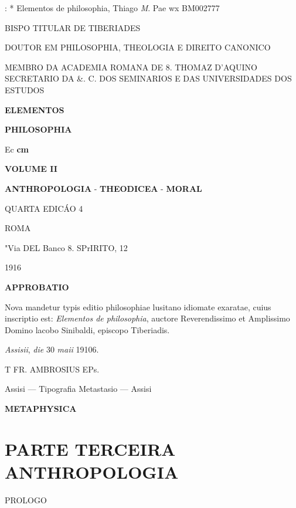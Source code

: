 
 : * \textbar{} Elementos de philosophia, Thiago \textbar{} \emph{M}. Pae wx BM002777

 BISPO TITULAR DE TIBERIADES

DOUTOR EM PHILOSOPHIA, THEOLOGIA E DIREITO CANONICO

MEMBRO DA ACADEMIA ROMANA DE 8. THOMAZ D'AQUINO SECRETARIO DA \&. C. DOS SEMINARIOS E DAS UNIVERSIDADES DOS ESTUDOS

\textbar{} \textbar{} \textbf{ELEMENTOS}

\textbf{PHILOSOPHIA}

\textbar{} Ec \textbf{cm}

\textbf{VOLUME II}

\textbf{ANTHROPOLOGIA} - \textbf{THEODICEA} - \textbf{MORAL}

QUARTA EDICÁO 4

ROMA

"Via DEL Banco 8. SPrIRITO, 12

1916

 \textbf{APPROBATIO}

Nova mandetur typis editio philosophiae lusitano idiomate exaratae, cuius inscriptio est: \emph{Elementos de philosophia}, auctore Reverendissimo et Amplissimo Domino lacobo Sinibaldi, episcopo Tiberiadis.

\emph{Assisii}, \emph{die} 30 \emph{maii} 19106.

T FR. AMBROSIUS EPs.

Assisi --- Tipografia Metastasio --- Assisi

 \textbf{METAPHYSICA}


\part*{PARTE TERCEIRA\\[0.3em]\large ANTHROPOLOGIA}

PROLOGO


